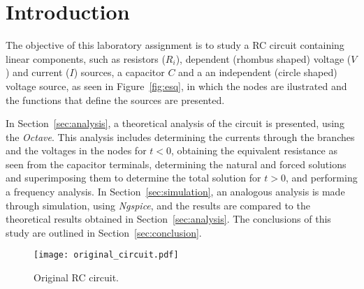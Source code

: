 \section{Introduction}
\label{sec:introduction}

The objective of this laboratory assignment is to study a RC circuit containing linear components, 
such as resistors ($R_i$), dependent (rhombus shaped) voltage ($V$) and current ($I$) 
sources, a capacitor $C$ and a an independent (circle shaped) voltage source, as seen in Figure~\ref{fig:esq}, in which the nodes are ilustrated and the functions that define the sources are presented.


In Section~\ref{sec:analysis}, a theoretical analysis of the circuit is
presented, using the \textit{Octave}. This analysis includes determining the currents through the branches and the voltages in the nodes for $t<0$, obtaining the equivalent resistance as seen from the capacitor terminals, determining the natural and forced solutions and superimposing them to determine the total solution for $t>0$, and performing a frequency analysis. 
In Section~\ref{sec:simulation}, an analogous analysis is made through simulation, using \textit{Ngspice}, and the results are compared to the theoretical results obtained in Section~\ref{sec:analysis}. The conclusions of this study are outlined in
Section~\ref{sec:conclusion}.


\begin{figure}[h] \centering
    \texttt{[image: original\_circuit.pdf]}
    \caption{Original RC circuit.}
    \label{fig:OG_circ}
    \end{figure}
    



